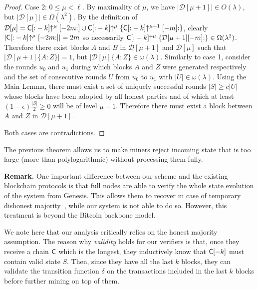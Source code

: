 \begin{proof}
	Case 2: $0 \leq \mu < \ell$. By maximality of $\mu$, we have
	$|\mathcal{D}[\mu + 1]| \in O(\lambda)$, but
	$|\mathcal{D}[\mu]| \in \Omega(\lambda^2)$.
	By the definition of
	$\mathcal{D}[\mu] = \mathsf{C}[{:}-k]\negthickspace\uparrow^\mu[-2m{:}] \cup
	\mathsf{C}[{:}-k]\negthickspace\uparrow^\mu\{\mathsf{C}[{:}-k]\negthickspace\uparrow^{\mu+1}[-m]{:}\}$, clearly
	$|\mathsf{C}[{:}-k]\negthickspace\uparrow^\mu[-2m{:}]| = 2m$ so necessarily
	$\mathsf{C}[{:}-k]\negthickspace\uparrow^\mu\{\mathcal{D}[\mu+1][-m]{:}\} \in \Omega(\lambda^2)$. Therefore there exist blocks $A$ and $B$
	in $\mathcal{D}[\mu+1]$ and $\mathcal{D}[\mu]$ such that
	$|\mathcal{D}[\mu + 1]\{A{:}Z\}| = 1$, but
	$|\mathcal{D}[\mu]\{A{:}Z\} \in \omega(\lambda)$. Similarly to case
	1, consider the rounds $u_0$ and $u_1$ during which blocks $A$ and $Z$ were
	generated respectively and the set of consecutive rounds $U$ from $u_0$ to
	$u_1$ with $|U| \in \omega(\lambda)$. Using the Main Lemma, there
	must exist a set of uniquely successful rounds $|S| \geq c|U|$ whose blocks
	have been adopted by all honest parties and of which at
	least $(1 - \epsilon)\frac{|S|}{2} \geq 0$ will be of level $\mu + 1$.
	Therefore there must exist a block between $A$ and $Z$ in
	$\mathcal{D}[\mu + 1]$.

	Both cases are contradictions.
\end{proof}

The previous theorem allows us to make miners reject incoming state that is too
large (more than polylogarithmic) without processing them fully.

\noindent
\textbf{Remark.} One important difference between our scheme and the existing
blockchain protocols is that full nodes are able to verify the whole state
evolution of the system from Genesis. This allows them to recover in case of
temporary dishonest majority~\cite{avarikioti2019bitcoin}, while our system is
not able to do so. However, this treatment is beyond the Bitcoin backbone model.

We note here that our analysis critically relies on the honest majority
assumption. The reason why \emph{validity} holds for our verifiers is that, once
they receive a chain $\mathsf{C}$ which is the longest, they inductively know that
$\mathsf{C}[-k]$ must contain valid state $S$. Then, since they have all the last
$k$ blocks, they can validate the transition function $\delta$ on the
transactions included in the last $k$ blocks before further mining on top of
them.
